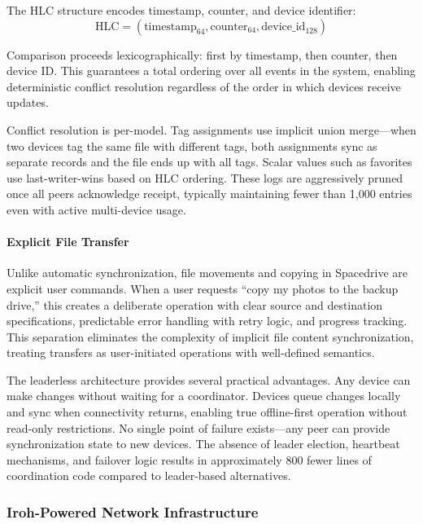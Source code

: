 \documentclass[sigconf]{acmart}
\begin{document}
The HLC structure encodes timestamp, counter, and device identifier:
\begin{equation}
\text{HLC} = (\text{timestamp}_{64}, \text{counter}_{64}, \text{device\_id}_{128})
\end{equation}

Comparison proceeds lexicographically: first by timestamp, then counter, then device ID. This guarantees a total ordering over all events in the system, enabling deterministic conflict resolution regardless of the order in which devices receive updates.

Conflict resolution is per-model. Tag assignments use implicit union merge---when two devices tag the same file with different tags, both assignments sync as separate records and the file ends up with all tags. Scalar values such as favorites use last-writer-wins based on HLC ordering. These logs are aggressively pruned once all peers acknowledge receipt, typically maintaining fewer than 1,000 entries even with active multi-device usage.

\paragraph{Explicit File Transfer}

Unlike automatic synchronization, file movements and copying in Spacedrive are explicit user commands. When a user requests ``copy my photos to the backup drive,'' this creates a deliberate operation with clear source and destination specifications, predictable error handling with retry logic, and progress tracking. This separation eliminates the complexity of implicit file content synchronization, treating transfers as user-initiated operations with well-defined semantics.

The leaderless architecture provides several practical advantages. Any device can make changes without waiting for a coordinator. Devices queue changes locally and sync when connectivity returns, enabling true offline-first operation without read-only restrictions. No single point of failure exists---any peer can provide synchronization state to new devices. The absence of leader election, heartbeat mechanisms, and failover logic results in approximately 800 fewer lines of coordination code compared to leader-based alternatives.

\subsubsection{Iroh-Powered Network Infrastructure}
\end{document}
